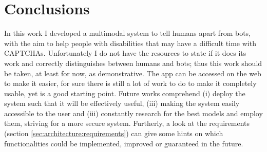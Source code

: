 \section{Conclusions}
In this work I developed a multimodal system to tell humans apart from bots, with the aim to help people with disabilities that may have a difficult time with CAPTCHAs.
Unfortunately I do not have the resources to state if it does its work and correctly distinguishes between humans and bots; thus this work should be taken, at least for now, as demonstrative.
The app can be accessed on the web to make it easier, for sure there is still a lot of work to do to make it completely usable, yet is a good starting point.
Future works comprehend (i) deploy the system such that it will be effectively useful, (iii) making the system easily accessible to the user and (iii) constantly research for the best models and employ them, striving for a more secure system.
Furtherly, a look at the requirements (section \ref{sec:architecture:requirements}) can give some hints on which functionalities could be implemented, improved or guaranteed in the future.